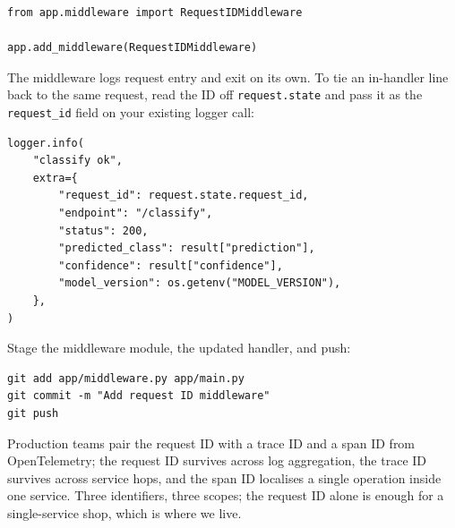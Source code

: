 \begin{verbatim}
from app.middleware import RequestIDMiddleware

app.add_middleware(RequestIDMiddleware)
\end{verbatim}

The middleware logs request entry and exit on its own. To tie an
in-handler line back to the same request, read the ID off
\texttt{request.state} and pass it as the \texttt{request\_id} field on
your existing logger call:

\begin{verbatim}
logger.info(
    "classify ok",
    extra={
        "request_id": request.state.request_id,
        "endpoint": "/classify",
        "status": 200,
        "predicted_class": result["prediction"],
        "confidence": result["confidence"],
        "model_version": os.getenv("MODEL_VERSION"),
    },
)
\end{verbatim}


Stage the middleware module, the updated handler, and push:

\begin{verbatim}
git add app/middleware.py app/main.py
git commit -m "Add request ID middleware"
git push
\end{verbatim}

 Production teams pair the request
ID with a trace ID and a span ID from OpenTelemetry; the request ID
survives across log aggregation, the trace ID survives across service
hops, and the span ID localises a single operation inside one service.
Three identifiers, three scopes; the request ID alone is enough for a
single-service shop, which is where we live.

